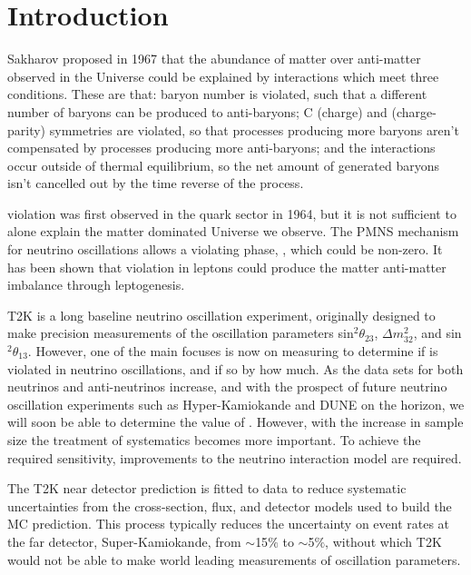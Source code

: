 \chapter{Introduction} \label{sec:introductions}

Sakharov proposed in 1967\cite{sakharov} that the abundance of matter over anti-matter observed in the Universe could be explained by interactions which meet three conditions. These are that: baryon number is violated, such that a different number of baryons can be produced to anti-baryons; C (charge) and \CP (charge-parity) symmetries are violated, so that processes producing more baryons aren't compensated by processes producing more anti-baryons; and the interactions occur outside of thermal equilibrium, so the net amount of generated baryons isn't cancelled out by the time reverse of the process. 

\CP violation was first observed in the quark sector in 1964\cite{quarkcpv}, but it is not sufficient to alone explain the matter dominated Universe we observe. The PMNS mechanism for neutrino oscillations allows a \CP violating phase, \deltacp, which could be non-zero. It has been shown that \CP violation in leptons could produce the matter anti-matter imbalance through leptogenesis\cite{leptogenesis}. 

T2K \cite{PhysRevLett.121.171802} is a long baseline neutrino oscillation experiment, originally designed to make precision measurements of the oscillation parameters sin$^2\theta_{23}$, $\Delta m^2_{32}$, and sin$^2\theta_{13}$. However, one of the main focuses is now on measuring \deltacp to determine if \CP is violated in neutrino oscillations, and if so by how much. As the data sets for both neutrinos and anti-neutrinos increase, and with the prospect of future neutrino oscillation experiments such as Hyper-Kamiokande \cite{Abe:2018uyc} and DUNE \cite{acciarri2016longbaseline} on the horizon, we will soon be able to determine the value of \deltacp. However, with the increase in sample size the treatment of systematics becomes more important. To achieve the required sensitivity, improvements to the neutrino interaction model are required.

The T2K near detector prediction is fitted to data to reduce systematic uncertainties from the cross-section, flux, and detector models used to build the MC prediction. This process typically reduces the uncertainty on event rates at the far detector, Super-Kamiokande, from $\sim$15$\%$ to $\sim$5$\%$, without which T2K would not be able to make world leading measurements of oscillation parameters.

